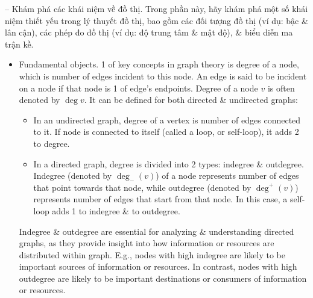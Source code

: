 \documentclass{article}
\begin{document}
\begin{itemize}
\begin{itemize}
        -- {\sf Khám phá các khái niệm về đồ thị.} Trong phần này, hãy khám phá một số khái niệm thiết yếu trong lý thuyết đồ thị, bao gồm các đối tượng đồ thị (ví dụ: bậc \& lân cận), các phép đo đồ thị (ví dụ: độ trung tâm \& mật độ), \& biểu diễn ma trận kề.
        \begin{itemize}
            \item {\sf Fundamental objects.} 1 of key concepts in graph theory is degree of a node, which is number of edges incident to this node. An edge is said to be incident on a node if that node is 1 of edge's endpoints. Degree of a node $v$ is often denoted by $\deg v$. It can be defined for both directed \& undirected graphs:
            \begin{itemize}
                \item In an undirected graph, degree of a vertex is number of edges connected to it. If node is connected to itself (called a loop, or self-loop), it adds 2 to degree.
                \item In a directed graph, degree is divided into 2 types: indegree \& outdegree. Indegree (denoted by $\deg_-(v)$) of a node represents number of edges that point towards that node, while outdegree (denoted by $\deg^+(v)$) represents number of edges that start from that node. In this case, a self-loop adds 1 to indegree \& to outdegree.
            \end{itemize}
            Indegree \& outdegree are essential for analyzing \& understanding directed graphs, as they provide insight into how information or resources are distributed within graph. E.g., nodes with high indegree are likely to be important sources of information or resources. In contrast, nodes with high outdegree are likely to be important destinations or consumers of information or resources.


\end{itemize}
\end{itemize}
\end{itemize}
\end{document}
